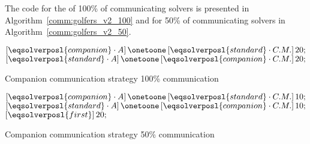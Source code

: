 The code for the \commstr{} of 100\% of communicating solvers is presented in Algorithm~\ref{comm:golfers_v2_100} and for 50\% of communicating solvers in Algorithm~\ref{comm:golfers_v2_50}. 

\begin{algorithm}[H]
\dontprintsemicolon
\SetNoline
$\left[\eqsolverposl{companion}\cdot A\right] \onetoone \left[\eqsolverposl{standard}\cdot C.M.\right]20;$\;
$\left[\eqsolverposl{standard}\cdot A\right] \onetoone \left[\eqsolverposl{companion}\cdot C.M.\right]20;$
\caption{Companion communication strategy 100\% communication}\label{comm:golfers_v2_100}
\end{algorithm}

\begin{algorithm}[H]
\dontprintsemicolon
\SetNoline
$\left[\eqsolverposl{companion}\cdot A\right] \onetoone \left[\eqsolverposl{standard}\cdot C.M.\right]10;$\;
$\left[\eqsolverposl{standard}\cdot A\right] \onetoone \left[\eqsolverposl{companion}\cdot C.M.\right]10;$\;
$\left[\eqsolverposl{first}\right]20;$\;
\caption{Companion communication strategy 50\% communication}\label{comm:golfers_v2_50}
\end{algorithm}

\begin{table}
\captionsetup{belowskip=6pt,aboveskip=6pt}
\centering 
\renewcommand{\arraystretch}{1}
\caption{Companion \commstr{} with communication \oneTn}
\label{tab:golfers_v2_1N}
\end{table}

